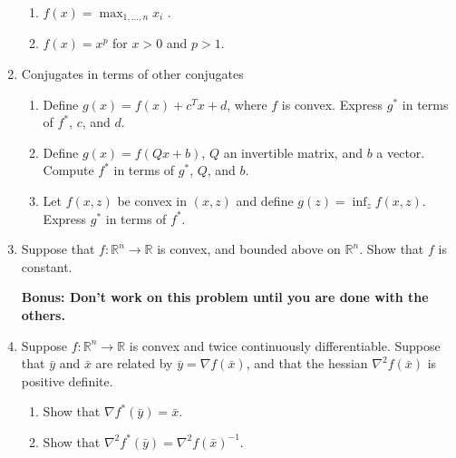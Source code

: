 \documentclass[12pt]{amsart}
\begin{document}
\begin{enumerate}
\begin{enumerate}
\item $f(x) = \max_{1, \dots, n} x_i$ . 

\item $f(x) = x^p$ for $x > 0$ and $p > 1$. 

\end{enumerate}

\item Conjugates in terms of other conjugates

\begin{enumerate}

\item Define $g(x) = f(x) + c^Tx + d$, where $f$ is convex. Express $g^*$ in terms of $f^*$, $c$, and $d$. 

\item Define $g(x) = f(Qx + b)$, $Q$ an invertible matrix, and $b$ a vector. Compute $f^*$ in terms of $g^*$, $Q$, and $b$.

\item Let $f(x,z)$ be convex in $(x,z)$ and define $g(z) = \inf_z f(x,z)$. Express $g^*$ in terms of $f^*$.


\end{enumerate}



\item Suppose that $f: \mathbb{R}^n \rightarrow \mathbb{R}$ is convex, and bounded above on $\mathbb{R}^n$. Show that $f$ is constant. 


\vspace{2in}

{\bf Bonus: Don't work on this problem until you are done with the others. }

\item Suppose $f: \mathbb{R}^n \rightarrow \mathbb{R}$ is convex and twice continuously differentiable. Suppose that $\bar y$ and $\bar x$ 
are related by $\bar y = \nabla f(\bar x)$, and that the hessian $\nabla^2 f(\bar x)$ is positive definite. 

\begin{enumerate}
\item  Show that $\nabla f^* (\bar y) = \bar x$. 

\item Show that $\nabla^2 f^* (\bar y) = \nabla^2 f(\bar x)^{-1}$.

\end{enumerate}

\end{enumerate}
\end{document}
